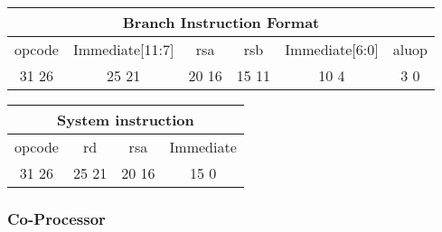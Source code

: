 \documentclass[letterpaper, 11pt]{article}
\begin{document}
\begin{center}
		\begin{tabular}{|c|c|c|c|c|c|}
			\multicolumn{6}{c}{Branch Instruction Format}\\ \hline
				\hspace{2pt} opcode \hspace{2pt} & \hspace{5pt} Immediate[11:7] \hspace{5pt} &  \hspace{4pt} rsa \hspace{4pt} & \hspace{4pt}rsb  \hspace{4pt}& \hspace{10pt}Immediate[6:0]  \hspace{10pt} & \hspace{3pt} aluop \hspace{3pt}   \\	\hline
			31 \hfill 26& 25 \hfill 21 &20 \hfill  16& 15 \hfill  11&10 \hfill   4&3 \hfill   0\\ \hline
		
	\end{tabular}
\end{center}

\begin{center}
		\begin{tabular}{|c|c|c|c|}
			\multicolumn{4}{c}{System instruction}\\ \hline
				\hspace{2pt} opcode \hspace{2pt} & \hspace{5pt} rd \hspace{5pt} &  \hspace{4pt} rsa \hspace{4pt} & \hspace{10pt}Immediate  \hspace{10pt}  \\	\hline
			31 \hfill 26& 25 \hfill 21 &20 \hfill  16& 15  \hfill   0\\ \hline
		
	\end{tabular}
\end{center}

\subsubsection{Co-Processor}
\end{document}

